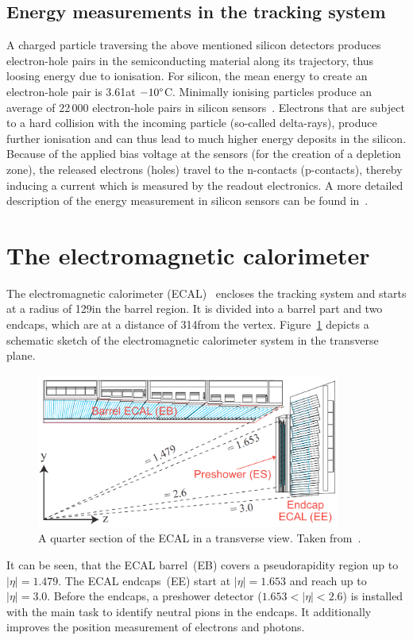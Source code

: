 \subsection*{Energy measurements in the tracking system}
A charged particle traversing the above mentioned silicon detectors produces electron-hole pairs in the semiconducting material along its trajectory, thus loosing energy due to ionisation.
For silicon, the mean energy to create an electron-hole pair is 3.61\ev at $-10\degree$C.
Minimally ionising particles produce an average of 22\,000 electron-hole pairs in silicon sensors~\cite{Thesis_Jenny}.
Electrons that are subject to a hard collision with the incoming particle (so-called delta-rays), produce further ionisation and can thus lead to much higher energy deposits in the silicon.
Because of the applied bias voltage at the sensors (for the creation of a depletion zone), the released electrons (holes) travel to the n-contacts (p-contacts), thereby inducing a current which is measured by the readout electronics. 
A more detailed description of the energy measurement in silicon sensors can be found in~\cite{Thesis_Jenny}.

\section{The electromagnetic calorimeter}
The electromagnetic calorimeter (ECAL)~\cite{bib:CMS:TDR_2006,bib:CMS:TDR_ECAL} encloses the tracking system and starts at a radius of 129\cm in the barrel region.
It is divided into a barrel part and two endcaps, which are at a distance of 314\cm from the vertex.
Figure~\ref{fig:ECAL} depicts a schematic sketch of the electromagnetic calorimeter system in the transverse plane.
\begin{figure}[!ht]
  \centering
      \includegraphics[width=0.89\textwidth]{figures/experiment/CMS/Figures_Experimental_Apparatus_ECALRapidity.png}
  \caption{A quarter section of the ECAL in a transverse view. Taken from~\cite{bib:CMS:TDR_2006}.}  
  \label{fig:ECAL}
\end{figure}
It can be seen, that the ECAL barrel~(EB) covers a pseudorapidity region up to $|\eta|=1.479$.
The ECAL endcaps~(EE) start at $|\eta|=1.653$ and reach up to $|\eta|=3.0$.
Before the endcaps, a preshower detector ($1.653<|\eta|<2.6$) is installed with the main task to identify neutral pions in the endcaps.
It additionally improves the position measurement of electrons and photons.


